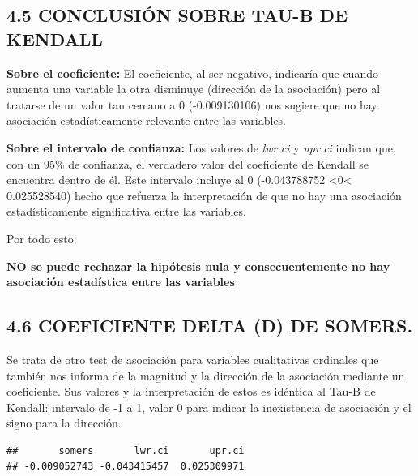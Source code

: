 \documentclass[
  12 pt,
  a4paper,
]{article}
\newenvironment{Shaded}{\begin{snugshade}}{\end{snugshade}}
\newcommand{\AttributeTok}[1]{\textcolor[rgb]{0.13,0.29,0.53}{#1}}
\newcommand{\FloatTok}[1]{\textcolor[rgb]{0.00,0.00,0.81}{#1}}
\newcommand{\FunctionTok}[1]{\textcolor[rgb]{0.13,0.29,0.53}{\textbf{#1}}}
\newcommand{\NormalTok}[1]{#1}
\newcommand{\OtherTok}[1]{\textcolor[rgb]{0.56,0.35,0.01}{#1}}
\newcommand{\SpecialCharTok}[1]{\textcolor[rgb]{0.81,0.36,0.00}{\textbf{#1}}}
\begin{document}
\subsection{4.5 CONCLUSIÓN SOBRE TAU-B DE
KENDALL}\label{conclusiuxf3n-sobre-tau-b-de-kendall}

\textbf{Sobre el coeficiente:} El coeficiente, al ser negativo,
indicaría que cuando aumenta una variable la otra disminuye (dirección
de la asociación) pero al tratarse de un valor tan cercano a 0
(-0.009130106) nos sugiere que no hay asociación estadísticamente
relevante entre las variables.

\textbf{Sobre el intervalo de confianza:} Los valores de \emph{lwr.ci} y
\emph{upr.ci} indican que, con un 95\% de confianza, el verdadero valor
del coeficiente de Kendall se encuentra dentro de él. Este intervalo
incluye al 0 (-0.043788752 \textless0\textless{} 0.025528540) hecho que
refuerza la interpretación de que no hay una asociación estadísticamente
significativa entre las variables.

Por todo esto:

\textbf{NO se puede rechazar la hipótesis nula y consecuentemente no hay
asociación estadística entre las variables}

\subsection{4.6 COEFICIENTE DELTA (D) DE
SOMERS.}\label{coeficiente-delta-d-de-somers.}

Se trata de otro test de asociación para variables cualitativas
ordinales que también nos informa de la magnitud y la dirección de la
asociación mediante un coeficiente. Sus valores y la interpretación de
estos es idéntica al Tau-B de Kendall: intervalo de -1 a 1, valor 0 para
indicar la inexistencia de asociación y el signo para la dirección.

\begin{Shaded}
\end{Shaded}

\begin{verbatim}
##       somers       lwr.ci       upr.ci 
## -0.009052743 -0.043415457  0.025309971
\end{verbatim}
\end{document}
